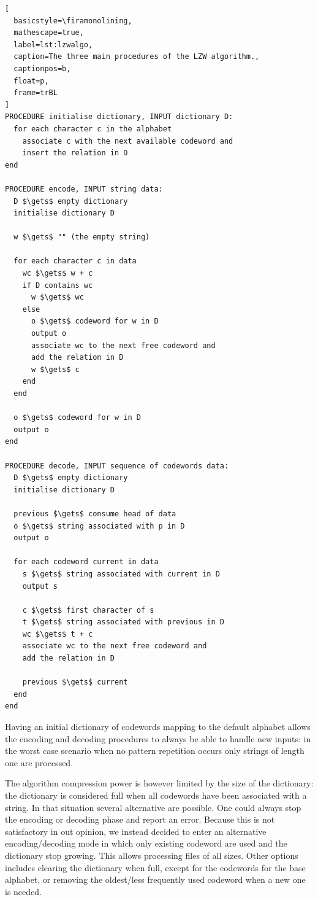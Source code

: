 \documentclass[a4paper,twoside]{article}
\begin{document}
\begin{lstlisting}[
  basicstyle=\firamonolining,
  mathescape=true,
  label=lst:lzwalgo,
  caption=The three main procedures of the LZW algorithm.,
  captionpos=b,
  float=p,
  frame=trBL
]
PROCEDURE initialise dictionary, INPUT dictionary D:
  for each character c in the alphabet
    associate c with the next available codeword and
    insert the relation in D
end

PROCEDURE encode, INPUT string data:
  D $\gets$ empty dictionary
  initialise dictionary D

  w $\gets$ "" (the empty string)

  for each character c in data
    wc $\gets$ w + c
    if D contains wc
      w $\gets$ wc
    else
      o $\gets$ codeword for w in D
      output o
      associate wc to the next free codeword and
      add the relation in D
      w $\gets$ c
    end
  end

  o $\gets$ codeword for w in D
  output o
end

PROCEDURE decode, INPUT sequence of codewords data:
  D $\gets$ empty dictionary
  initialise dictionary D

  previous $\gets$ consume head of data
  o $\gets$ string associated with p in D
  output o

  for each codeword current in data
    s $\gets$ string associated with current in D
    output s

    c $\gets$ first character of s
    t $\gets$ string associated with previous in D
    wc $\gets$ t + c
    associate wc to the next free codeword and
    add the relation in D

    previous $\gets$ current
  end
end
\end{lstlisting}

Having an initial dictionary of codewords mapping to the default alphabet allows
the encoding and decoding procedures to always be able to handle new inputs: in
the worst case scenario when no pattern repetition occurs only strings of length
one are processed.

The algorithm compression power is however limited by the size of the
dictionary: the dictionary is considered full when all codewords have been
associated with a string. In that situation several alternative are possible.
One could always stop the encoding or decoding phase and report an error.
Because this is not satisfactory in out opinion, we instead decided to enter an
alternative encoding/decoding mode in which only existing codeword are used and
the dictionary stop growing. This allows processing files of all sizes. Other
options includes clearing the dictionary when full, except for the codewords for
the base alphabet, or removing the oldest/less frequently used codeword when a
new one is needed.
\end{document}
